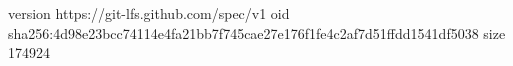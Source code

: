 version https://git-lfs.github.com/spec/v1
oid sha256:4d98e23bcc74114e4fa21bb7f745cae27e176f1fe4c2af7d51ffdd1541df5038
size 174924
